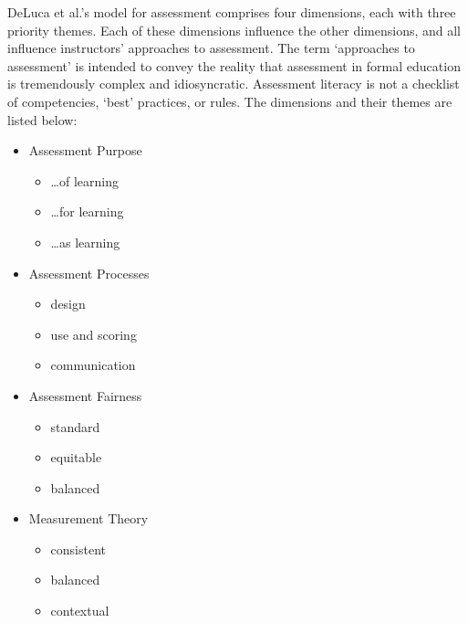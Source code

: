 \documentclass[
]{book}
\providecommand{\tightlist}{%
  \setlength{\itemsep}{0pt}\setlength{\parskip}{0pt}}
\begin{document}
DeLuca et al.'s model for assessment comprises four dimensions, each with three priority themes. Each of these dimensions influence the other dimensions, and all influence instructors' approaches to assessment. The term `approaches to assessment' is intended to convey the reality that assessment in formal education is tremendously complex and idiosyncratic. Assessment literacy is not a checklist of competencies, `best' practices, or rules. The dimensions and their themes are listed below:

\begin{itemize}
\tightlist
\item
  Assessment Purpose

  \begin{itemize}
  \tightlist
  \item
    \ldots of learning\\
  \item
    \ldots for learning\\
  \item
    \ldots as learning\\
  \end{itemize}
\item
  Assessment Processes

  \begin{itemize}
  \tightlist
  \item
    design\\
  \item
    use and scoring\\
  \item
    communication\\
  \end{itemize}
\item
  Assessment Fairness

  \begin{itemize}
  \tightlist
  \item
    standard\\
  \item
    equitable\\
  \item
    balanced\\
  \end{itemize}
\item
  Measurement Theory

  \begin{itemize}
  \tightlist
  \item
    consistent\\
  \item
    balanced\\
  \item
    contextual
  \end{itemize}
\end{itemize}
\end{document}
